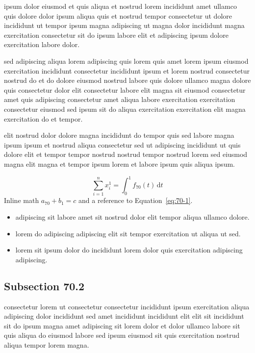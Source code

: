 \documentclass{article}
\begin{document}
ipsum dolor eiusmod et quis aliqua et nostrud lorem incididunt amet ullamco quis dolore dolor ipsum aliqua quis et nostrud tempor consectetur ut dolore incididunt ut tempor ipsum magna adipiscing ut magna dolor incididunt magna exercitation consectetur sit do ipsum labore elit et adipiscing ipsum dolore exercitation labore dolor.

sed adipiscing aliqua lorem adipiscing quis lorem quis amet lorem ipsum eiusmod exercitation incididunt consectetur incididunt ipsum et lorem nostrud consectetur nostrud do et do dolore eiusmod nostrud labore quis dolore ullamco magna dolore quis consectetur dolor elit consectetur labore elit magna sit eiusmod consectetur amet quis adipiscing consectetur amet aliqua labore exercitation exercitation consectetur eiusmod sed ipsum sit do aliqua exercitation exercitation elit magna exercitation do et tempor.

elit nostrud dolor dolore magna incididunt do tempor quis sed labore magna ipsum ipsum et nostrud aliqua consectetur sed ut adipiscing incididunt ut quis dolore elit et tempor tempor nostrud nostrud tempor nostrud lorem sed eiusmod magna elit magna et tempor ipsum lorem et labore ipsum quis aliqua ipsum.

\begin{equation}\label{eq:70-1}
  \sum_{i=1}^{n} x_i^{1} = \int_0^1 f_{70}(t)\,\mathrm{d}t
\end{equation}
Inline math $a_{70} + b_{1} = c$ and a reference to Equation~\eqref{eq:70-1}.

\begin{itemize}
  \item adipiscing sit labore amet sit nostrud dolor elit tempor aliqua ullamco dolore.
  \item lorem do adipiscing adipiscing elit sit tempor exercitation ut aliqua ut sed.
  \item lorem sit ipsum dolor do incididunt lorem dolor quis exercitation adipiscing adipiscing.
\end{itemize}

\subsection{Subsection 70.2}\label{sec:70-2}
consectetur lorem ut consectetur consectetur incididunt ipsum exercitation aliqua adipiscing dolor incididunt sed amet incididunt incididunt elit elit sit incididunt sit do ipsum magna amet adipiscing sit lorem dolor et dolor ullamco labore sit quis aliqua do eiusmod labore sed ipsum eiusmod sit quis exercitation nostrud aliqua tempor lorem magna.
\end{document}
